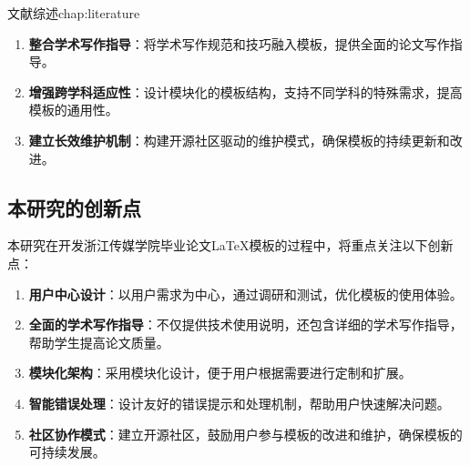 \begin{cuzchapter}{文献综述}{chap:literature}
\begin{enumerate}
		\item \textbf{整合学术写作指导}：将学术写作规范和技巧融入模板，提供全面的论文写作指导。
		
		\item \textbf{增强跨学科适应性}：设计模块化的模板结构，支持不同学科的特殊需求，提高模板的通用性。
		
		\item \textbf{建立长效维护机制}：构建开源社区驱动的维护模式，确保模板的持续更新和改进。
	\end{enumerate}
	
	\subsection{本研究的创新点}
	
	本研究在开发浙江传媒学院毕业论文\LaTeX{}模板的过程中，将重点关注以下创新点：
	
	\begin{enumerate}
		\item \textbf{用户中心设计}：以用户需求为中心，通过调研和测试，优化模板的使用体验。
		
		\item \textbf{全面的学术写作指导}：不仅提供技术使用说明，还包含详细的学术写作指导，帮助学生提高论文质量。
		
		\item \textbf{模块化架构}：采用模块化设计，便于用户根据需要进行定制和扩展。
		
		\item \textbf{智能错误处理}：设计友好的错误提示和处理机制，帮助用户快速解决问题。
		
		\item \textbf{社区协作模式}：建立开源社区，鼓励用户参与模板的改进和维护，确保模板的可持续发展。
	\end{enumerate}

\end{cuzchapter}
